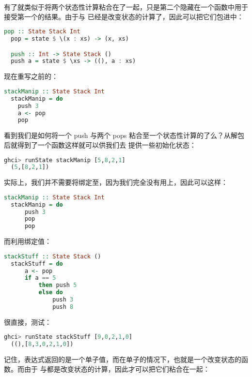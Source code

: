 \documentclass[./main.tex]{subfiles}
\begin{document}
有了\acode{>>=}就类似于将两个状态性计算粘合在了一起，只是第二个隐藏在一个函数中用于接受第一个的结果。由于与
已经是改变状态的计算了，因此可以把它们包进中：

\begin{lstlisting}[language=Haskell]
  pop :: State Stack Int
  pop = state $ \(x : xs) -> (x, xs)

  push :: Int -> State Stack ()
  push a = state $ \xs -> ((), a : xs)
\end{lstlisting}

现在重写之前的：

\begin{lstlisting}[language=Haskell]
  stackManip :: State Stack Int
  stackManip = do
    push 3
    a <- pop
    pop
\end{lstlisting}

看到我们是如何将一个 push 与两个 pops 粘合至一个状态性计算的了么？从解包后就得到了一个函数这样就可以供我们去
提供一些初始化状态：

\begin{lstlisting}[language=Haskell]
  ghci> runState stackManip [5,8,2,1]
  (5,[8,2,1])
\end{lstlisting}

实际上，我们并不需要将绑定至，因为我们完全没有用上，因此可以这样：

\begin{lstlisting}[language=Haskell]
  stackManip :: State Stack Int
  stackManip = do
      push 3
      pop
      pop
\end{lstlisting}

而利用绑定值：

\begin{lstlisting}[language=Haskell]
  stackStuff :: State Stack ()
  stackStuff = do
      a <- pop
      if a == 5
          then push 5
          else do
              push 3
              push 8
\end{lstlisting}

很直接，测试：

\begin{lstlisting}[language=Haskell]
  ghci> runState stackStuff [9,0,2,1,0]
  ((),[8,3,0,2,1,0])
\end{lstlisting}

记住，表达式返回的是一个单子值，而在单子的情况下，也就是一个改变状态的函数。而由于
与都是改变状态的计算，因此才可以把它们粘合在一起：
\end{document}
